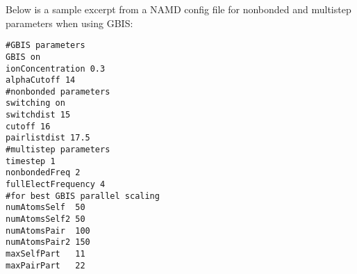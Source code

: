 Below is a sample excerpt from a NAMD config file for nonbonded and multistep parameters when using GBIS:
\begin{verbatim}
#GBIS parameters
GBIS on
ionConcentration 0.3
alphaCutoff 14
#nonbonded parameters
switching on
switchdist 15
cutoff 16
pairlistdist 17.5
#multistep parameters
timestep 1
nonbondedFreq 2
fullElectFrequency 4
#for best GBIS parallel scaling
numAtomsSelf  50
numAtomsSelf2 50
numAtomsPair  100
numAtomsPair2 150
maxSelfPart   11
maxPairPart   22

\end{verbatim}
%
%
%

\begin{comment}

\end{comment}
